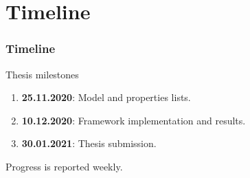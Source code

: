 \documentclass{beamer}
\begin{document}
\section{Timeline}
\begin{frame}
  \frametitle{Timeline}
  Thesis milestones
  \begin{enumerate}
    \item \textbf{25.11.2020}: Model and properties lists.
    \item \textbf{10.12.2020}: Framework implementation and results.
    \item \textbf{30.01.2021}: Thesis submission.
  \end{enumerate}
  Progress is reported weekly.
\end{frame}
\end{document}
